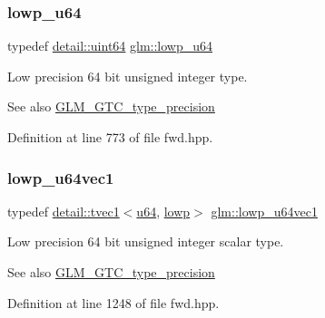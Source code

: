 \subsubsection{\texorpdfstring{lowp\+\_\+u64}{lowp\_u64}}
{\footnotesize\ttfamily typedef \hyperlink{namespaceglm_1_1detail_adec4b19bf4982125e122db2fe03c5810}{detail\+::uint64} \hyperlink{group__gtc__type__precision_ga61ed4c68a4cffb77cd63cc107119123a}{glm\+::lowp\+\_\+u64}}

Low precision 64 bit unsigned integer type. \begin{DoxySeeAlso}{See also}
\hyperlink{group__gtc__type__precision}{G\+L\+M\+\_\+\+G\+T\+C\+\_\+type\+\_\+precision} 
\end{DoxySeeAlso}


Definition at line 773 of file fwd.\+hpp.

\mbox{\label{group__gtc__type__precision_gacd97dc5e92d0e2f6f6d62a5160508e2a}} 
\subsubsection{\texorpdfstring{lowp\+\_\+u64vec1}{lowp\_u64vec1}}
{\footnotesize\ttfamily typedef \hyperlink{structglm_1_1detail_1_1tvec1}{detail\+::tvec1}$<$\hyperlink{group__gtc__type__precision_ga71cedd4972f9cb1a5e14dfe5ab83ecd7}{u64}, \hyperlink{namespaceglm_a0f04f086094c747d227af4425893f545ae161af3fc695e696ce3bf69f7332bc2d}{lowp}$>$ \hyperlink{group__gtc__type__precision_gacd97dc5e92d0e2f6f6d62a5160508e2a}{glm\+::lowp\+\_\+u64vec1}}

Low precision 64 bit unsigned integer scalar type. \begin{DoxySeeAlso}{See also}
\hyperlink{group__gtc__type__precision}{G\+L\+M\+\_\+\+G\+T\+C\+\_\+type\+\_\+precision} 
\end{DoxySeeAlso}


Definition at line 1248 of file fwd.\+hpp.

\mbox{\label{group__gtc__type__precision_gae0e7d3ed32e8e79b4f6dd0c9baafcaea}} 
